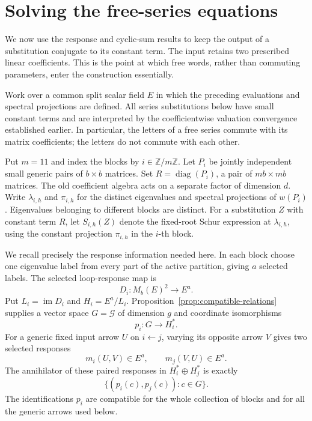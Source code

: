 \section{Solving the free-series equations}
\label{sec:free-correction}

We now use the response and cyclic-sum results to keep the output of a
substitution conjugate to its constant term.  The input retains two prescribed
linear coefficients.  This is the point at which free words, rather than
commuting parameters, enter the construction essentially.

Work over a common split scalar field $E$ in which the preceding evaluations
and spectral projections are defined.  All series substitutions below have
small constant terms and are interpreted by the coefficientwise valuation
convergence established earlier.  In particular, the letters of a free series
commute with its matrix coefficients; the letters do not commute with each
other.

Put $m=11$ and index the blocks by $i\in\mathbb Z/m\mathbb Z$.
Let $P_i$ be jointly independent small generic pairs of $b\times b$
matrices.  Set $R=\operatorname{diag}(P_i)$, a pair of $mb\times mb$
matrices.  The old coefficient algebra acts on a separate factor of dimension
$d$.  Write $\lambda_{i,h}$ and $\pi_{i,h}$ for the distinct eigenvalues
and spectral projections of $w(P_i)$.  Eigenvalues belonging to different
blocks are distinct.  For a substitution $Z$ with constant term $R$, let
$S_{i,h}(Z)$ denote the fixed-root Schur expression at $\lambda_{i,h}$,
using the constant projection $\pi_{i,h}$ in the $i$-th block.

We recall precisely the response information needed here.  In each block
choose one eigenvalue label from every part of the active partition, giving
$a$ selected labels.  The selected loop-response map is
\[
 D_i:M_b(E)^2\longrightarrow E^a.
\]
Put $L_i=\operatorname{im}D_i$ and $H_i=E^a/L_i$.
Proposition~\ref{prop:compatible-relations} supplies a vector space
$G=\mathcal G$ of dimension $g$ and coordinate isomorphisms
\[
 p_i:G\longrightarrow H_i^*.
\]
For a generic fixed input arrow $U$ on $i\leftarrow j$, varying its
opposite arrow $V$ gives two selected responses
\[
 m_i(U,V)\in E^a,
 \qquad m_j(V,U)\in E^a.
\]
The annihilator of these paired responses in $H_i^*\oplus H_j^*$ is
exactly
\begin{equation}
 \{(p_i(c),p_j(c)):c\in G\}.
 \label{eq:correction-paired-annihilator}
\end{equation}
The identifications $p_i$ are compatible for the whole collection of blocks
and for all the generic arrows used below.

